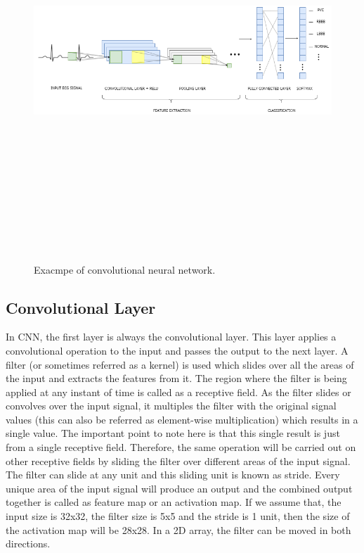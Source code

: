 \begin{figure}[htpb]
	\centering
	\includegraphics[width=15cm,height=15cm,keepaspectratio=true]{images/cnn_1d}
	\caption{
		Exacmpe of convolutional neural network.
	}
	\label{fig:cnn_1d}
\end{figure}

\subsection{Convolutional Layer}
In CNN, the first layer is always the convolutional layer. This layer applies a convolutional operation to the input and passes the output to the next layer. A filter (or sometimes referred as a kernel) is used which slides over all the areas of the input and extracts the features from it. The region where the filter is being applied at any instant of time is called as a receptive field. As the filter slides or convolves over the input signal, it multiples the filter with the original signal values (this can also be referred as element-wise multiplication) which results in a single value. The important point to note here is that this single result is just from a single receptive field. Therefore, the same operation will be carried out on other receptive fields by sliding the filter over different areas of the input signal. The filter can slide at any unit and this sliding unit is known as stride. Every unique area of the input signal will produce an output and the combined output together is called as feature map or an activation map.  If we assume that, the input size is 32x32, the filter size is 5x5 and the stride is 1 unit, then the size of the activation map will be 28x28. In a 2D array, the filter can be moved in both directions.

